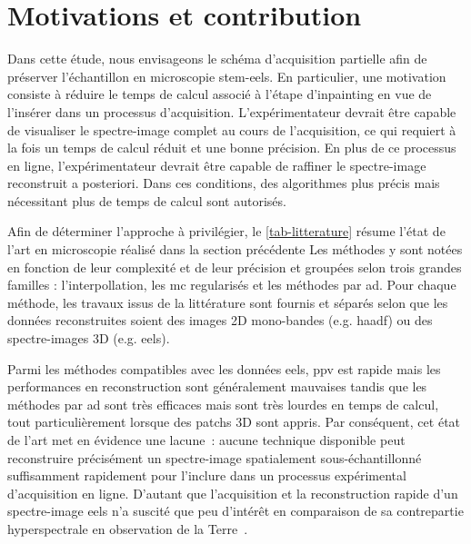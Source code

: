 %
\section{Motivations et contribution}

Dans cette étude, nous envisageons le schéma d'acquisition partielle afin de préserver l'échantillon en microscopie \gls{stem}-\gls{eels}. En particulier, une motivation consiste à réduire le temps de calcul associé à l'étape d'inpainting en vue de l'insérer dans un processus d'acquisition. L'expérimentateur devrait être capable de visualiser le spectre-image complet au cours de l'acquisition, ce qui requiert à la fois un temps de calcul réduit et une bonne précision. En plus de ce processus en ligne, l'expérimentateur devrait être capable de raffiner le spectre-image reconstruit a posteriori. Dans ces conditions, des algorithmes plus précis mais nécessitant plus de temps de calcul sont autorisés. 

\begin{table}[t]
    \centering
    
    \caption{Comparaison des méthodes proposées dans la littérature en microscopie pour le reconstruction d'images partiellement échantillonnées. Des références supplémentaires n'étant pas issues de la littérature en microscopie sont données en italique. Le temps d'exécution et la précision sont évaluées qualitativement en se basant sur les résultats des chapitres suivants.%
        \protect\label{tab-litterature}}
\end{table}

Afin de déterminer l'approche à privilégier, le \cref{tab-litterature} résume l'état de l'art en microscopie réalisé dans la section précédente Les méthodes y sont notées en fonction de leur complexité et de leur précision et groupées selon trois grandes familles : l'interpollation, les \gls{mc} regularisés et les méthodes par \gls{ad}. Pour chaque méthode, les travaux issus de la littérature sont fournis et séparés selon que les données reconstruites soient des images 2D mono-bandes (e.g. \gls{haadf}) ou des spectre-images 3D (e.g. \gls{eels}).

Parmi les méthodes compatibles avec les données \gls{eels}, \gls{ppv} est rapide mais les performances en reconstruction sont généralement mauvaises tandis que les méthodes par \gls{ad} sont très efficaces mais sont très lourdes en temps de calcul, tout particulièrement lorsque des patchs 3D sont appris. Par conséquent, cet état de l'art met en évidence une lacune : aucune technique disponible peut reconstruire précisément un spectre-image spatialement sous-échantillonné suffisamment rapidement pour l'inclure dans un processus expérimental d'acquisition en ligne. D'autant que l'acquisition et la reconstruction rapide d'un spectre-image \gls{eels} n'a suscité que peu d'intérêt en comparaison de sa contrepartie hyperspectrale en observation de la Terre~\cite{zhang_hyperspectral_2014, chayes_pre_processing_2017, golbabaee_hyperspectral_2012, chen_inpainting_2012}.

